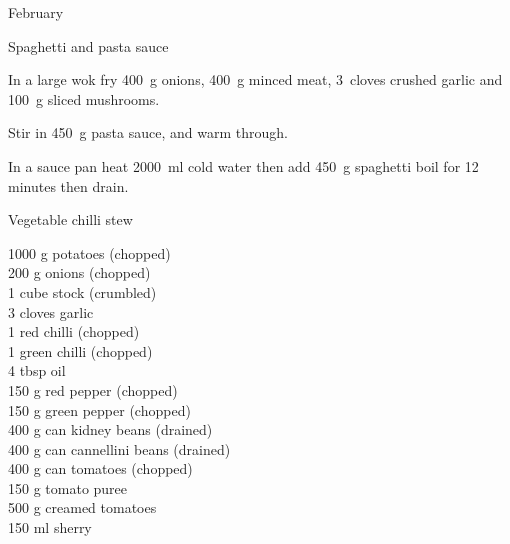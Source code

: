 \begin{menu}{February}
\begin{recipe}{2}{Spaghetti and pasta sauce}
\begin{ingredients}
		\end{ingredients}
	
	
    \begin{instructions}
    \item 
        In a large wok fry
        400~g  onions,
        400~g  minced meat,
        3~cloves crushed garlic
        and
        100~g sliced mushrooms.
      \item 
        Stir in
        450~g  pasta sauce,
        and warm through.
      \item 
      In a sauce pan heat
      2000~ml  cold water then add
      450~g  spaghetti
      boil for 12
      minutes then drain.
    
    \end{instructions}
    \end{recipe}%
  
    \begin{recipe}{2}{Vegetable chilli stew}%
    
		\begin{ingredients}
		1000 g potatoes (chopped) \\
	200 g onions (chopped) \\
	1 cube stock (crumbled) \\
	3 cloves garlic  \\
	1  red chilli (chopped) \\
	1  green chilli (chopped) \\
	4 tbsp oil  \\
	150 g red pepper (chopped) \\
	150 g green pepper (chopped) \\
	400 g can kidney beans (drained) \\
	400 g can cannellini beans (drained) \\
	400 g can tomatoes (chopped) \\
	150 g tomato puree  \\
	500 g creamed tomatoes  \\
	150 ml sherry  \\
	
		\end{ingredients}
	

\end{recipe}
\end{menu}
